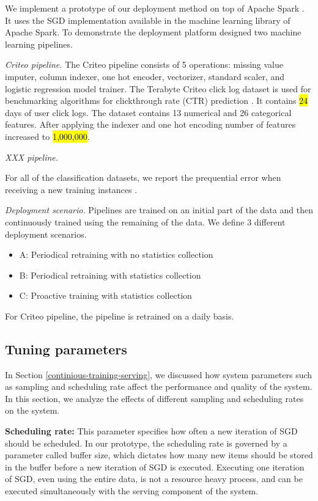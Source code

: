 \documentclass[10pt,conference,letterpaper]{IEEEtran}
\begin{document}
We implement a prototype of our deployment method on top of Apache Spark \cite{zaharia2010spark}.
It uses the SGD implementation available in the machine learning library of Apache Spark.
To demonstrate the deployment platform designed two machine learning pipelines.

\textit{Criteo pipeline.} The Criteo pipeline consists of 5 operations: missing value imputer, column indexer, one hot encoder, vectorizer, standard scaler, and logistic regression model trainer. 
The Terabyte Criteo click log dataset is used for benchmarking algorithms for clickthrough rate (CTR) prediction \cite{criteo-log}.
It contains \hl{24} days of user click logs. 
The dataset  contains 13 numerical and 26 categorical features. 
After applying the indexer and one hot encoding number of features increased to \hl{1,000,000}.

\textit{XXX pipeline.} 

For all of the classification datasets, we report the prequential error when receiving a new training instances \cite{gama2009issues} .

\textit{Deployment scenario.} 
Pipelines are trained on an initial part of the data and then continuously trained using the remaining of the data.
We define 3 different deployment scenarios.
\begin{itemize}
\item A: Periodical retraining with no statistics collection
\item B: Periodical retraining with statistics collection
\item C: Proactive training with statistics collection
\end{itemize}

For Criteo pipeline, the pipeline is retrained on a daily basis.

\subsection{Tuning parameters} \label{tuning}
In Section \ref{continious-training-serving}, we discussed how system parameters such as sampling and scheduling rate affect the performance and quality of the system.
In this section, we analyze the effects of different sampling and scheduling rates on the system.

\textbf{Scheduling rate:} 
This parameter specifies how often a new iteration of SGD should be scheduled. 
In our prototype, the scheduling rate is governed by a parameter called buffer size, which dictates how many new items should be stored in the buffer before a new iteration of SGD is executed. 
Executing one iteration of SGD, even using the entire data, is not a resource heavy process, and can be executed simultaneously with the serving component of the system. 
\end{document}
